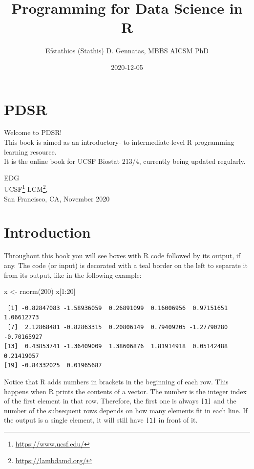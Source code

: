 \documentclass[
]{book}
\title{Programming for Data Science in R}
\author{Efstathios (Stathis) D. Gennatas, MBBS AICSM PhD}
\date{2020-12-05}
\newenvironment{Shaded}{\begin{snugshade}}{\end{snugshade}}
\newcommand{\DecValTok}[1]{\textcolor[rgb]{0.00,0.00,0.81}{#1}}
\newcommand{\FunctionTok}[1]{\textcolor[rgb]{0.00,0.00,0.00}{#1}}
\newcommand{\NormalTok}[1]{#1}
\newcommand{\OtherTok}[1]{\textcolor[rgb]{0.56,0.35,0.01}{#1}}
\newcommand{\SpecialCharTok}[1]{\textcolor[rgb]{0.00,0.00,0.00}{#1}}
\DeclareRobustCommand{\href}[2]{#2\footnote{\url{#1}}}
\begin{document}
\maketitle

{
\setcounter{tocdepth}{2}
\tableofcontents
}
\hypertarget{pdsr}{%
\chapter*{PDSR}\label{pdsr}}


Welcome to PDSR!\\
This book is aimed as an introductory- to intermediate-level R programming learning resource.\\
It is the online book for UCSF Biostat 213/4, currently being updated regularly.

EDG\\
\href{https://www.ucsf.edu/}{UCSF} \href{https://lambdamd.org/}{LCM},\\
San Francisco, CA, November 2020

\hypertarget{introduction}{%
\chapter{Introduction}\label{introduction}}

Throughout this book you will see boxes with R code followed by its output, if any. The code (or input) is decorated with a teal border on the left to separate it from its output, like in the following example:

\begin{Shaded}
\begin{Highlighting}[]
\NormalTok{x }\OtherTok{\textless{}{-}} \FunctionTok{rnorm}\NormalTok{(}\DecValTok{200}\NormalTok{)}
\NormalTok{x[}\DecValTok{1}\SpecialCharTok{:}\DecValTok{20}\NormalTok{]}
\end{Highlighting}
\end{Shaded}

\begin{verbatim}
 [1] -0.82847083 -1.58936059  0.26891099  0.16006956  0.97151651  1.06612773
 [7]  2.12868481 -0.82863315  0.20806149  0.79409205 -1.27790280 -0.70165927
[13]  0.43853741 -1.36409009  1.38606876  1.81914918  0.05142488  0.21419057
[19] -0.84332025  0.01965687
\end{verbatim}

Notice that R adds numbers in brackets in the beginning of each row. This happens when R prints the contents of a vector. The number is the integer index of the first element in that row. Therefore, the first one is always \texttt{{[}1{]}} and the number of the subsequent rows depends on how many elements fit in each line. If the output is a single element, it will still have \texttt{{[}1{]}} in front of it.
\end{document}
